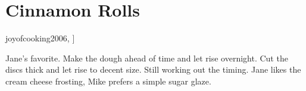 \section{Cinnamon Rolls}


\begin{recipestats}[
	servings=16,
	preptime=1,
	bakingtime=cook time,
	inactivetime=12 \hour,
	source=Jane \& Mike,
	original=\citetitle{joyofcooking2006}~\cite[p.~621]{joyofcooking2006},
]
\end{recipestats}


\begin{recipeabstract}
	Jane's favorite.
	Make the dough ahead of time and let rise overnight.
	Cut the discs thick and let rise to decent size.
	Still working out the timing.
	Jane likes the cream cheese frosting, Mike prefers a simple sugar glaze.
\end{recipeabstract}


\begin{ingredientcolumns}
	\begin{ingredientblock}[dough]
		\\
		\\
		\\
		\\
		\\
		\\
		\\
		\\
		\\
	\end{ingredientblock}

	\columnbreak
	\begin{ingredientblock}[filling]
		\\
		\\
	\end{ingredientblock}

	\medskip
	\begin{ingredientblock}[frosting]
		\\
		\\
		\\
	\end{ingredientblock}
\end{ingredientcolumns}


